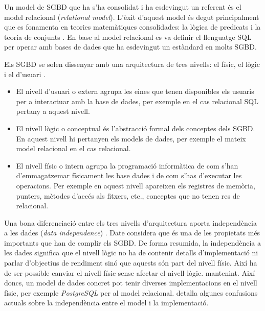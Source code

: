 Un model de \gls{SGBD} que ha s'ha consolidat i ha esdevingut un
referent és el model relacional (\emph{relational model}). L'èxit
d'aquest model és degut principalment que es fonamenta en teories
matemàtiques consolidades: la lògica de predicats i la teoria de
conjunts \parencite{date:introduction}. En base al model relacional es
va definir el llenguatge \gls{SQL} per operar amb bases de dades que
ha esdevingut un estàndard en molts \gls{SGBD}.


Els \gls{SGBD} se solen dissenyar amb una arquitectura de tres nivells: el
físic, el lògic i el d'usuari \parencite{date:introduction}. 
\begin{itemize}

\item El nivell d'usuari o extern agrupa les eines que tenen
  disponibles els usuaris per a interactuar amb la base de dades, per
  exemple en el cas relacional \gls{SQL} pertany a aquest nivell.

\item El nivell lògic o conceptual és l'abstracció formal dels
  conceptes dels \gls{SGBD}. En aquest nivell hi pertanyen els models de
  dades, per exemple el mateix model relacional en el cas relacional.

\item El nivell físic o intern agrupa la programació informàtica de
  com s'han d'emmagatzemar físicament les base dades i de com s'has
  d'executar les operacions. Per exemple en aquest nivell apareixen
  els registres de memòria, punters, mètodes d'accés als fitxers,
  etc., conceptes que no tenen res de relacional.
\end{itemize}


Una bona diferenciació entre els tres nivells d'arquitectura aporta
independència a les dades (\emph{data
  independence}) \parencite{date:dictionary}. Date considera que és
una de les propietats més importants que han de complir els \gls{SGBD}. De
forma resumida, la independència a les dades significa que el nivell
lògic no ha de contenir detalls d'implementació ni parlar d'objectius
de rendiment sinó que aquests són part del nivell físic. Així ha de
ser possible canviar el nivell físic sense afectar el nivell lògic.
mantenint.  Així doncs, un model de dades concret pot tenir diverses
implementacions en el nivell físic, per exemple
\emph{PostgreSQL} \parencite{postgresql} per al model
relacional. \textcite{dbdebunk} detalla algunes confusions actuals
sobre la independència entre el model i la implementació.


